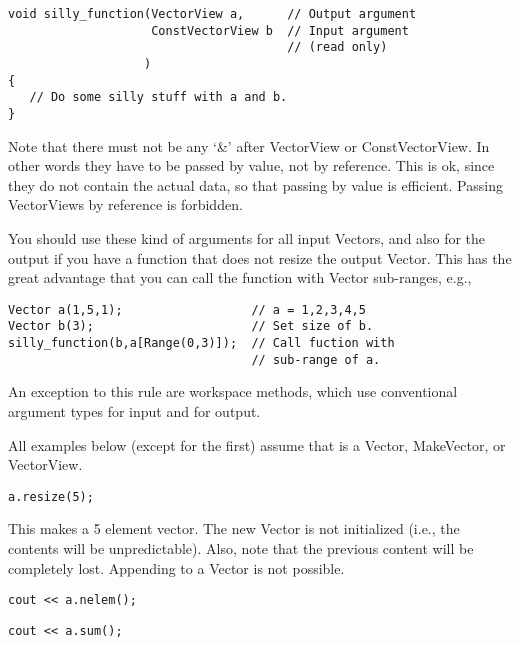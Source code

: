 \begin{verbatim}
void silly_function(VectorView a,      // Output argument
                    ConstVectorView b  // Input argument
                                       // (read only)
                   )
{
   // Do some silly stuff with a and b.
}
\end{verbatim}

Note that there must not be any `\&' after VectorView or
ConstVectorView. In other words they have to be passed by value, not
by reference. This is ok, since they do not contain the actual
data, so that passing by value is efficient. Passing VectorViews by
reference is forbidden.

You should use these kind of arguments for all input Vectors, and also
for the output if you have a function that does not resize the output
Vector. This has the great advantage that you can call the function
with Vector sub-ranges, e.g., 
\begin{verbatim}
Vector a(1,5,1);                  // a = 1,2,3,4,5
Vector b(3);                      // Set size of b.
silly_function(b,a[Range(0,3)]);  // Call fuction with
                                  // sub-range of a.
\end{verbatim}

An exception to this rule are workspace methods, which use
conventional argument types  for input and
 for output.


All examples below (except for the first) assume that  is a
Vector, MakeVector, or VectorView.

\begin{verbatim}
a.resize(5);
\end{verbatim}
This makes  a 5 element vector. The new Vector is not
initialized (i.e., the contents will be unpredictable). Also, note
that the previous content will be completely lost. Appending to a
Vector is not possible.

\begin{verbatim}
cout << a.nelem();
\end{verbatim}

\begin{verbatim}
cout << a.sum();
\end{verbatim}

